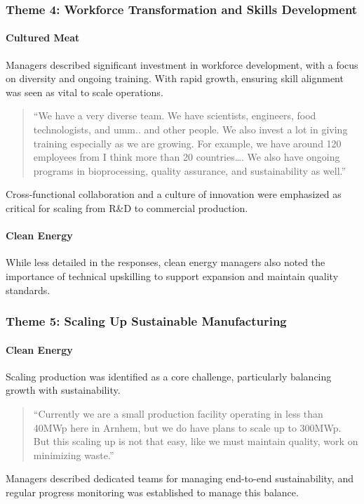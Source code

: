 \subsubsection{Theme 4: Workforce Transformation and Skills Development}
\paragraph{Cultured Meat}
Managers described significant investment in workforce development, with a focus on diversity and ongoing training. With rapid growth, ensuring skill alignment was seen as vital to scale operations.
\begin{quote}
	“We have a very diverse team. We have scientists, engineers, food technologists, and umm.. and other people. We also invest a lot in giving training especially as we are growing. For example, we have around 120 employees from I think more than 20 countries…. We also have ongoing programs in bioprocessing, quality assurance, and sustainability as well.”
\end{quote}
Cross-functional collaboration and a culture of innovation were emphasized as critical for scaling from R\&D to commercial production.

\paragraph{Clean Energy}
While less detailed in the responses, clean energy managers also noted the importance of technical upskilling to support expansion and maintain quality standards.

\subsubsection{Theme 5: Scaling Up Sustainable Manufacturing}
\paragraph{Clean Energy}
Scaling production was identified as a core challenge, particularly balancing growth with sustainability.
\begin{quote}
	“Currently we are a small production facility operating in less than 40MWp here in Arnhem, but we do have plans to scale up to 300MWp. But this scaling up is not that easy, like we must maintain quality, work on minimizing waste.”
\end{quote}
Managers described dedicated teams for managing end-to-end sustainability, and regular progress monitoring was established to manage this balance.

